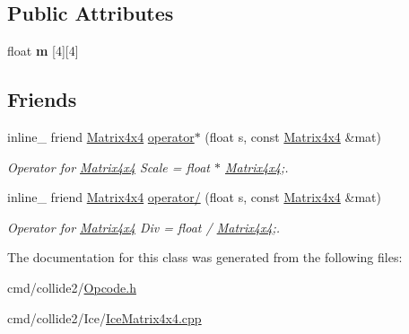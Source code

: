 \subsection*{Public Attributes}
\begin{DoxyCompactItemize}
\item 
float {\bfseries m} \mbox{[}4\mbox{]}\mbox{[}4\mbox{]}\hypertarget{classOpcode_1_1Matrix4x4_a1487156c3da0d250f04109d07fa924b1}{}\label{classOpcode_1_1Matrix4x4_a1487156c3da0d250f04109d07fa924b1}

\end{DoxyCompactItemize}
\subsection*{Friends}
\begin{DoxyCompactItemize}
\item 
inline\+\_\+ friend \hyperlink{classOpcode_1_1Matrix4x4}{Matrix4x4} \hyperlink{classOpcode_1_1Matrix4x4_ab3955edca55444de0746eb97b6c7e147}{operator$\ast$} (float s, const \hyperlink{classOpcode_1_1Matrix4x4}{Matrix4x4} \&mat)\hypertarget{classOpcode_1_1Matrix4x4_ab3955edca55444de0746eb97b6c7e147}{}\label{classOpcode_1_1Matrix4x4_ab3955edca55444de0746eb97b6c7e147}

\begin{DoxyCompactList}\small\item\em Operator for \hyperlink{classOpcode_1_1Matrix4x4}{Matrix4x4} Scale = float $\ast$ \hyperlink{classOpcode_1_1Matrix4x4}{Matrix4x4};. \end{DoxyCompactList}\item 
inline\+\_\+ friend \hyperlink{classOpcode_1_1Matrix4x4}{Matrix4x4} \hyperlink{classOpcode_1_1Matrix4x4_a07714d6be5eeb50d185286661ee092e0}{operator/} (float s, const \hyperlink{classOpcode_1_1Matrix4x4}{Matrix4x4} \&mat)\hypertarget{classOpcode_1_1Matrix4x4_a07714d6be5eeb50d185286661ee092e0}{}\label{classOpcode_1_1Matrix4x4_a07714d6be5eeb50d185286661ee092e0}

\begin{DoxyCompactList}\small\item\em Operator for \hyperlink{classOpcode_1_1Matrix4x4}{Matrix4x4} Div = float / \hyperlink{classOpcode_1_1Matrix4x4}{Matrix4x4};. \end{DoxyCompactList}\end{DoxyCompactItemize}


The documentation for this class was generated from the following files\+:\begin{DoxyCompactItemize}
\item 
cmd/collide2/\hyperlink{Opcode_8h}{Opcode.\+h}\item 
cmd/collide2/\+Ice/\hyperlink{IceMatrix4x4_8cpp}{Ice\+Matrix4x4.\+cpp}\end{DoxyCompactItemize}
